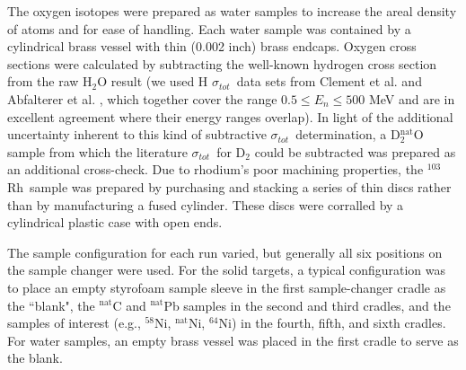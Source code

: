 \documentclass[twocolumn,secnumarabic,amssymb, nobibnotes, aps, prl,
superscriptaddress, nobalancelastpage]{revtex4}
\newcommand{\tot}{\ensuremath{\sigma_{tot}}}
\newcommand{\rhThree}{\ensuremath{^{103}}R\lowercase{h}}
\begin{document}
%
%
%
%

The oxygen isotopes were prepared as water samples to increase the areal density
of atoms and for ease of handling. Each water sample was contained by a
cylindrical brass vessel with thin (0.002 inch) brass endcaps. Oxygen cross sections were calculated by
subtracting the well-known hydrogen cross section from the raw H$_{2}$O result
(we used H \tot\  data sets from Clement et al. \cite{Clement1972} and Abfalterer
et al. \cite{Abfalterer2001}, which together cover the range $0.5 \leq E_n \leq 500$ MeV
and are in excellent agreement where their energy ranges overlap). In light of
the additional uncertainty inherent to this kind of subtractive \tot\ determination,
a D$_{2}^{\text{nat}}$O sample from which the literature \tot\  for
D$_{2}$ could be subtracted was prepared as an additional cross-check. Due to
rhodium's poor machining properties, the \rhThree\ sample
was prepared by purchasing and stacking a series of thin discs rather than by
manufacturing a fused cylinder. These discs were corralled
by a cylindrical plastic case with open ends.

The sample configuration for each run varied, but generally all six positions on
the sample changer were used. For the solid targets, a typical configuration was
to place an empty styrofoam sample sleeve in the first sample-changer cradle as
the ``blank", the $^{\text{nat}}$C and $^{\text{nat}}$Pb samples in the second and third
cradles, and the samples of interest (e.g., $^{58}$Ni, $^{\text{nat}}$Ni, $^{64}$Ni) in
the fourth, fifth, and sixth cradles. For water samples, an empty brass vessel
was placed in the first cradle to serve as the blank.
\end{document}

